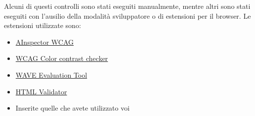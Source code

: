 Alcuni di questi controlli sono stati eseguiti manualmente, mentre altri sono stati eseguiti con l'ausilio della modalità sviluppatore o di estensioni per il browser.
Le estensioni utilizzate sono: \begin{itemize}
    \item \href{https://addons.mozilla.org/en-US/firefox/addon/ainspector-wcag/}{AInspector WCAG}
    \item \href{https://addons.mozilla.org/en-US/firefox/addon/wcag-contrast-checker/}{WCAG Color contrast checker}
    \item \href{https://chrome.google.com/webstore/detail/wave-evaluation-tool/jbbplnpkjmmeebjpijfedlgcdilocofh}{WAVE Evaluation Tool}
    \item \href{https://chrome.google.com/webstore/detail/html-validator/mpbelhhnfhfjnaehkcnnaknldmnocglk}{HTML Validator}
    \item Inserite quelle che avete utilizzato voi
\end{itemize}